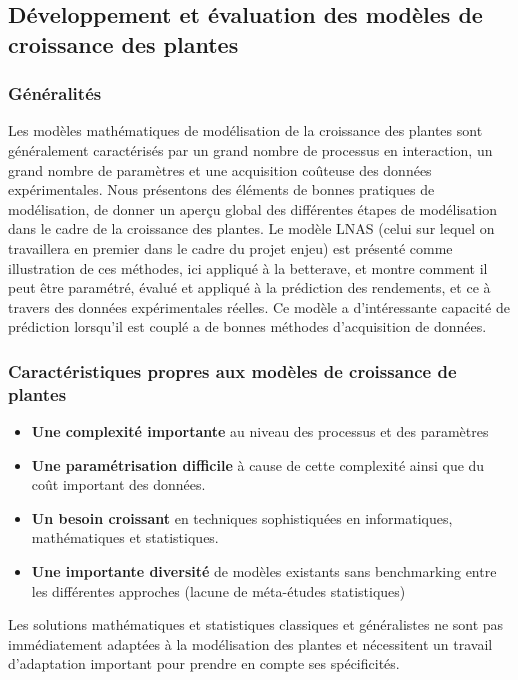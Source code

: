 \subsection{Développement et évaluation des modèles de croissance des plantes}

\subsubsection{Généralités}

Les modèles mathématiques de modélisation de la croissance des plantes sont généralement caractérisés par un grand nombre de processus en interaction,  un grand nombre de paramètres et une acquisition coûteuse des données expérimentales. 
Nous présentons des éléments de bonnes pratiques de modélisation, de donner un aperçu global des différentes étapes de modélisation dans le cadre de la croissance des plantes.
Le modèle LNAS (celui sur lequel on travaillera en premier dans le cadre du projet enjeu) est présenté comme illustration de ces méthodes, ici appliqué à la betterave, et montre comment il peut être paramétré, évalué et appliqué à la prédiction des rendements, et ce à travers des données expérimentales réelles. Ce modèle a d’intéressante capacité de prédiction lorsqu’il est couplé a de bonnes méthodes d’acquisition de données.

\subsubsection{Caractéristiques propres aux modèles de croissance de plantes}

\begin{itemize}

\item \textbf{Une complexité importante} au niveau des processus et des paramètres
\item \textbf{Une paramétrisation difficile} à cause de cette complexité ainsi que du coût important des données.
\item \textbf{Un besoin croissant} en techniques sophistiquées en informatiques, mathématiques et statistiques.
\item \textbf{Une importante diversité} de modèles existants sans benchmarking entre les différentes approches (lacune de méta-études statistiques)

\end{itemize}

Les solutions mathématiques et statistiques classiques et généralistes ne sont pas immédiatement adaptées à la modélisation des plantes et nécessitent un travail d’adaptation important pour prendre en compte ses spécificités.

